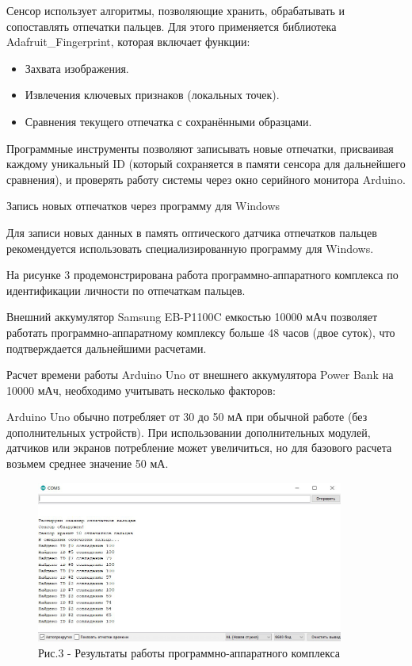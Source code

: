 \begin{multicols}{2}
Сенсор использует алгоритмы, позволяющие хранить, обрабатывать и
сопоставлять отпечатки пальцев. Для этого применяется библиотека
Adafruit\_Fingerprint, которая включает функции:

\begin{itemize}[leftmargin=*]
\item
  Захвата изображения.
\item
  Извлечения ключевых признаков (локальных точек).
\item
  Сравнения текущего отпечатка с сохранёнными образцами.
\end{itemize}

Программные инструменты позволяют записывать новые отпечатки, присваивая
каждому уникальный ID (который сохраняется в памяти сенсора для
дальнейшего сравнения), и проверять работу системы через окно серийного
монитора Arduino.

Запись новых отпечатков через программу для Windows

Для записи новых данных в память оптического датчика отпечатков пальцев
рекомендуется использовать специализированную программу для Windows.

На рисунке 3 продемонстрирована работа программно-аппаратного комплекса
по идентификации личности по отпечаткам пальцев.

Внешний аккумулятор Samsung EB-P1100C емкостью 10000 мАч позволяет
работать программно-аппаратному комплексу больше 48 часов (двое суток),
что подтверждается дальнейшими расчетами.

Расчет времени работы Arduino Uno от внешнего аккумулятора Power Bank на
10000 мАч, необходимо учитывать несколько факторов:

Arduino Uno обычно потребляет от 30 до 50 мА при обычной работе (без
дополнительных устройств). При использовании дополнительных модулей,
датчиков или экранов потребление может увеличиться, но для базового
расчета возьмем среднее значение 50 мА.
\end{multicols}

\begin{figure}[H]
	\centering
	\includegraphics[width=0.9\textwidth]{media/ict/image3}
	\caption*{Рис.3 - Результаты работы программно-аппаратного комплекса}
\end{figure}

